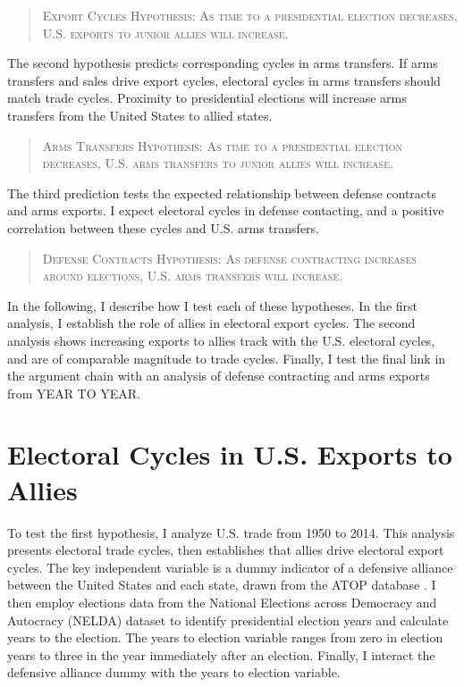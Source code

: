 \documentclass[12pt]{article}
\begin{document}
\begin{quote}
\textsc{Export Cycles Hypothesis: As time to a presidential election decreases, U.S. exports to junior allies will increase.}
\end{quote}



The second hypothesis predicts corresponding cycles in arms transfers.
If arms transfers and sales drive export cycles, electoral cycles in arms transfers should match trade cycles.
Proximity to presidential elections will increase arms transfers from the United States to allied states. 


\begin{quote}
\textsc{Arms Transfers Hypothesis: As time to a presidential election decreases, U.S. arms transfers to junior allies will increase.}
\end{quote}


The third prediction tests the expected relationship between defense contracts and arms exports. 
I expect electoral cycles in defense contacting, and a positive correlation between these cycles and U.S. arms transfers.


\begin{quote}
\textsc{Defense Contracts Hypothesis: As defense contracting increases around elections, U.S. arms transfers will increase.}
\end{quote}



In the following, I describe how I test each of these hypotheses. 
In the first analysis, I establish the role of allies in electoral export cycles. 
The second analysis shows increasing exports to allies track with the U.S. electoral cycles, and are of comparable magnitude to trade cycles.
Finally, I test the final link in the argument chain with an analysis of defense contracting and arms exports from YEAR TO YEAR.




\section{Electoral Cycles in U.S. Exports to Allies}

To test the first hypothesis, I analyze U.S. trade from 1950 to 2014. 
This analysis presents electoral trade cycles, then establishes that allies drive electoral export cycles.
The key independent variable is a dummy indicator of a defensive alliance between the United States and each state, drawn from the ATOP database \citep{Leedsetal2002}.
I then employ elections data from the National Elections across Democracy and Autocracy (NELDA) dataset \citep{HydeMarinov2012} to identify presidential election years and calculate years to the election.
The years to election variable ranges from zero in election years to three in the year immediately after an election.
Finally, I interact the defensive alliance dummy with the years to election variable.
\end{document}
